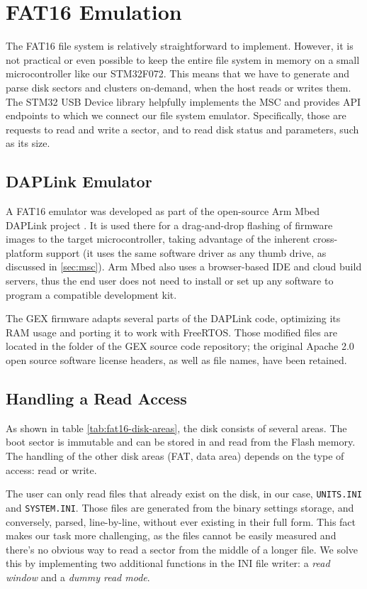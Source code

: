 \section{FAT16 Emulation}

The FAT16 file system is relatively straightforward to implement. However, it is not practical or even possible to keep the entire file system in memory on a small microcontroller like our STM32F072. This means that we have to generate and parse disk sectors and clusters on-demand, when the host reads or writes them. The STM32 \gls{USB} Device library helpfully implements the \gls{MSC} and provides \gls{API} endpoints to which we connect our file system emulator. Specifically, those are requests to read and write a sector, and to read disk status and parameters, such as its size.

\subsection{DAPLink Emulator}

A FAT16 emulator was developed as part of the open-source Arm Mbed DAPLink project \cite{daplink}. It is used there for a drag-and-drop flashing of firmware images to the target microcontroller, taking advantage of the inherent cross-platform support (it uses the same software driver as any thumb drive, as discussed in \ref{sec:msc}). Arm Mbed also uses a browser-based \gls{IDE} and cloud build servers, thus the end user does not need to install or set up any software to program a compatible development kit.

The GEX firmware adapts several parts of the DAPLink code, optimizing its \gls{RAM} usage and porting it to work with FreeRTOS. Those modified files are located in the folder  of the GEX source code repository; the original Apache 2.0 open source software license headers, as well as file names, have been retained.

\subsection{Handling a Read Access}

As shown in table \ref{tab:fat16-disk-areas}, the disk consists of several areas. The boot sector is immutable and can be stored in and read from the Flash memory. The handling of the other disk areas (\gls{FAT}, data area) depends on the type of access: read or write.

The user can only read files that already exist on the disk, in our case, \verb|UNITS.INI| and \verb|SYSTEM.INI|. Those files are generated from the binary settings storage, and conversely, parsed, line-by-line, without ever existing in their full form. This fact makes our task more challenging, as the files cannot be easily measured and there's no obvious way to read a sector from the middle of a longer file. We solve this by implementing two additional functions in the INI file writer: a \textit{read window} and a \textit{dummy read mode}.

